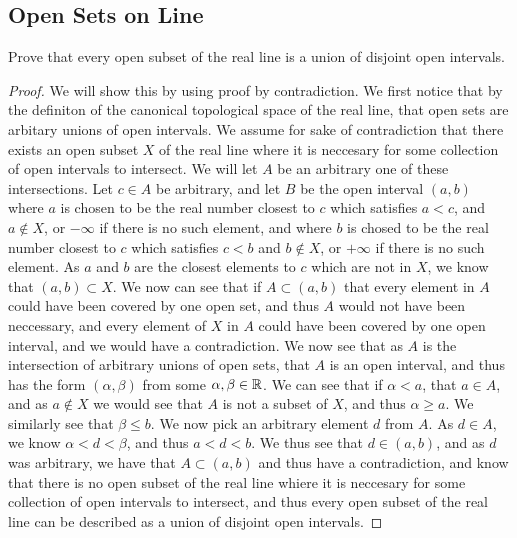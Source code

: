 \subsection{Open Sets on Line}
\begin{majorEx}
  Prove that every open subset of the real line is a union of disjoint
  open intervals.
\end{majorEx}

\begin{proof}
  We will show this by using proof by contradiction. We first notice
  that by the definiton of the canonical topological space of the real
  line, that open sets are arbitary unions of open intervals. We assume for
  sake of contradiction that there exists an open subset $X$ of the real
  line where it is neccesary for some collection of open intervals to intersect.
  We will let $A$ be an arbitrary one of these intersections. Let
  $c\in A$ be arbitrary, and let $B$ be the open interval $(a,b)$
  where $a$ is chosen to be the real number closest to $c$ which satisfies
  $a<c$, and $a\notin X$, or $-\infty$ if there is no such element,
  and where $b$ is chosed to be the real number closest to $c$ which
  satisfies $c<b$ and $b\notin X$, or $+\infty$ if there is no such
  element. As $a$ and $b$ are the closest elements to $c$ which are
  not in $X$, we know that $(a,b)\subset X$. We now can see that if
  $A\subset (a,b)$ that every element in $A$ could have been covered
  by one open set, and thus $A$ would not have been neccessary, and
  every element of $X$ in $A$ could have been covered by one open
  interval, and we would have a contradiction. We now see that as $A$
  is the intersection of arbitrary unions of open sets, that $A$ is an
  open interval, and thus has the form $(\alpha,\beta)$ from some
  $\alpha,\beta \in \mathbb{R}$. We can see that if $\alpha< a$, that $a\in
  A$, and as $a\notin X$ we would see that $A$ is not a subset of $X$,
  and thus $\alpha \geq a$. We similarly see that $\beta \leq b$. We
  now pick an arbitrary element $d$ from $A$. As $d\in A$, we know
  $\alpha < d < \beta$, and thus $a<d<b$. We thus see that $d\in
  (a,b)$, and as $d$ was arbitrary, we have that $A\subset (a,b)$  and
  thus have a contradiction, and know that there is no open subset of
  the real line whiere it is neccesary for some collection of open
  intervals to intersect, and thus  every open subset of the real line
  can be described as a union of disjoint
  open intervals.

\end{proof}
